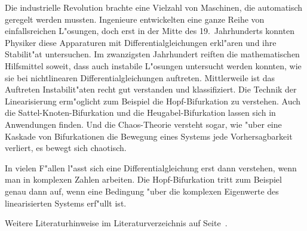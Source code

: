 Die industrielle Revolution brachte eine Vielzahl von Maschinen,
die automatisch geregelt werden mussten.
Ingenieure entwickelten eine ganze Reihe von einfallsreichen L"osungen,
doch erst in der Mitte des 19.~Jahrhunderts konnten Physiker diese
Apparaturen mit Differentialgleichungen erkl"aren und ihre Stabilit"at
untersuchen.
Im zwanzigsten Jahrhundert reiften die mathematischen Hilfsmittel
soweit, dass auch instabile L"osungen untersucht werden konnten,
wie sie bei nichtlinearen Differentialgleichungen auftreten.
Mittlerweile ist das Auftreten Instabilit"aten recht gut verstanden
und klassifiziert. 
Die Technik der Linearisierung erm"oglicht zum Beispiel die
Hopf-Bifurkation zu verstehen.
Auch die Sattel-Knoten-Bifurkation und die Heugabel-Bifurkation
lassen sich in Anwendungen finden.
Und die Chaos-Theorie versteht sogar, wie "uber eine Kaskade von
Bifurkationen die Bewegung eines Systems jede Vorhersagbarkeit verliert,
es bewegt sich chaotisch.

In vielen F"allen l"asst sich eine Differentialgleichung erst dann
verstehen, wenn man in komplexen Zahlen arbeiten. 
Die Hopf-Bifurkation tritt zum Beispiel genau dann auf, wenn eine
Bedingung "uber die komplexen Eigenwerte des linearisierten Systems
erf"ullt ist.

Weitere Literaturhinweise im Literaturverzeichnis auf
Seite~\pageref{skript:literatur}.

